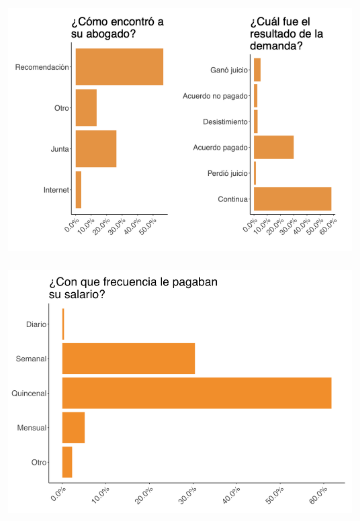 \documentclass[oneside,11pt]{article}
\begin{document}
\begin{figure}[H]
\begin{center}
    \begin{subfigure}{0.49\textwidth}
    \includegraphics[width=\textwidth]{04_Figures/worker_survey/Exp_5.png}
    \end{subfigure}
    \begin{subfigure}{0.49\textwidth}
    \includegraphics[width=\textwidth]{04_Figures/worker_survey/Exp_6.png}
    \end{subfigure}
    
    \end{center}
\end{figure}

\clearpage
\end{document}
